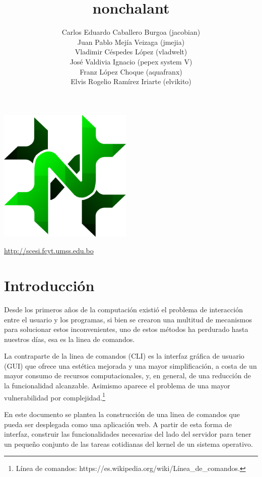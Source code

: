 \documentclass[letterpaper,11pt]{article}
\title{\bf nonchalant}
\author{
    Carlos Eduardo Caballero Burgoa (jacobian) \\
    Juan Pablo Mejía Veizaga (jmejia) \\
    Vladimir Céspedes López (vladwelt) \\
    José Valdivia Ignacio (pepex system V) \\
    Franz López Choque (aquafranx) \\
    Elvis Rogelio Ramírez Iriarte (elvikito) \\
}
\begin{document}
\maketitle
\begin{center}\includegraphics[width=0.48\textwidth]
{nonchalant.png}\end{center}
\begin{center}\url {http://scesi.fcyt.umss.edu.bo}\end{center}
\pagebreak

\tableofcontents
\pagebreak

\section{Introducción}
Desde los primeros años de la computación existió el problema de interacción
entre el usuario y los programas, si bien se crearon una multitud de
mecanismos para solucionar estos inconvenientes, uno de estos métodos ha
perdurado hasta nuestros días, esa es la linea de comandos.

La contraparte de la linea de comandos (CLI) es la interfaz gráfica de usuario
(GUI) que ofrece una estética mejorada y una mayor simplificación, a costa de
un mayor consumo de recursos computacionales, y, en general, de una reducción
de la funcionalidad alcanzable. Asimismo aparece el problema de una mayor
vulnerabilidad por complejidad.\footnote{Línea de comandos:
https://es.wikipedia.org/wiki/Línea\_de\_comandos.}

En este documento se plantea la construcción de una linea de comandos que
pueda ser desplegada como una aplicación web. A partir de esta forma de
interfaz, construir las funcionalidades necesarias del lado del servidor para
tener un pequeño conjunto de las tareas cotidianas del kernel de un sistema
operativo.
\end{document}
